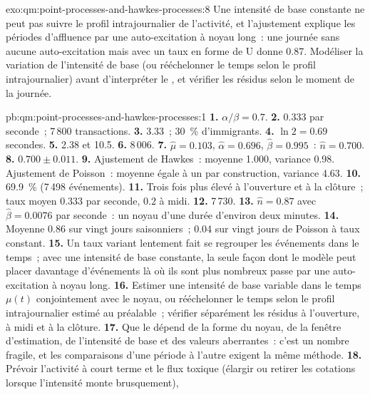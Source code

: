 \begin{solution}{exo:qm:point-processes-and-hawkes-processes:8}
Une intensité de base constante ne peut pas suivre le profil intrajournalier de l'activité, et l'ajustement explique les périodes d'affluence par
une auto-excitation à noyau long~: une journée sans aucune auto-excitation mais avec un taux en forme de U donne 0.87. Modéliser la
variation de l'intensité de base (ou rééchelonner le temps selon le profil intrajournalier) avant d'interpréter le , et vérifier
les résidus selon le moment de la journée.
\end{solution}

\begin{solution}{pb:qm:point-processes-and-hawkes-processes:1}
\textbf{1.} $\alpha/\beta = 0.7$.
\textbf{2.} $0.333$ par seconde~; 7\,800 transactions.
\textbf{3.} $3.33$~; 30~\% d'immigrants.
\textbf{4.} $\ln 2 = 0.69$ secondes.
\textbf{5.} 2.38 et 10.5.
\textbf{6.} 8\,006.
\textbf{7.} $\hat\mu = 0.103$, $\hat\alpha = 0.696$, $\hat\beta = 0.995$~: $\hat n = 0.700$.
\textbf{8.} $0.700 \pm 0.011$.
\textbf{9.} Ajustement de Hawkes~: moyenne 1.000, variance 0.98. Ajustement de Poisson~: moyenne égale à un par construction, variance 4.63.
\textbf{10.} 69.9~\% (7\,498 événements).
\textbf{11.} Trois fois plus élevé à l'ouverture et à la clôture~; taux moyen $0.333$ par seconde, $0.2$ à midi.
\textbf{12.} 7\,730.
\textbf{13.} $\hat n = 0.87$ avec $\hat\beta = 0.0076$ par seconde~: un noyau d'une durée d'environ deux minutes.
\textbf{14.} Moyenne 0.86 sur vingt jours saisonniers~; 0.04 sur vingt jours de Poisson à taux constant.
\textbf{15.} Un taux variant lentement fait se regrouper les événements dans le temps~; avec une intensité de base constante, la seule façon dont le modèle
peut placer davantage d'événements là où ils sont plus nombreux passe par une auto-excitation à noyau long.
\textbf{16.} Estimer une intensité de base variable dans le temps $\mu(t)$ conjointement avec le noyau, ou rééchelonner le temps selon le profil intrajournalier estimé
au préalable~; vérifier séparément les résidus à l'ouverture, à midi et à la clôture.
\textbf{17.} Que le  dépend de la forme du noyau, de la fenêtre d'estimation, de l'intensité de base et des valeurs aberrantes~:
c'est un nombre fragile, et les comparaisons d'une période à l'autre exigent la même méthode.
\textbf{18.} Prévoir l'activité à court terme et le flux toxique (élargir ou retirer les cotations lorsque l'intensité monte brusquement),

\end{solution}
